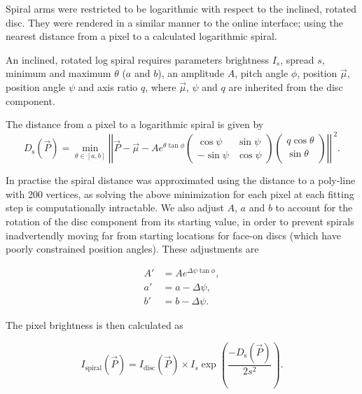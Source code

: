 \documentclass[../main.tex]{subfiles}
\begin{document}
Spiral arms were restricted to be logarithmic with respect to the inclined, rotated disc. They were rendered in a similar manner to the online interface; using the nearest distance from a pixel to a calculated logarithmic spiral.

An inclined, rotated log spiral requires parameters brightness $I_s$, spread $s$, minimum and maximum $\theta$ ($a$ and $b$), an amplitude $A$, pitch angle $\phi$, position $\vec\mu$, position angle $\psi$ and axis ratio $q$, where $\vec\mu$, $\psi$ and $q$ are inherited from the disc component.

The distance from a pixel to a logarithmic spiral is given by
\begin{equation}
  D_\mathrm{s}(\vec{P}) = \min_{\theta\in[a, b]}\left|\left|\vec{P} - \vec\mu - Ae^{\theta\tan\phi}\begin{pmatrix}
       \cos\psi & \sin\psi\\
       -\sin\psi & \cos\psi
       \end{pmatrix}
       \begin{pmatrix}
       q\cos\theta \\
       \sin\theta \\
       \end{pmatrix}
       \right|\right|^{\ 2}.
\end{equation}

In practise the spiral distance was approximated using the distance to a poly-line with 200 vertices, as solving the above minimization for each pixel at each fitting step is computationally intractable. We also adjust $A$, $a$ and $b$ to account for the rotation of the disc component from its starting value, in order to prevent spirals inadvertendly moving far from starting locations for face-on discs (which have poorly constrained position angles). These adjustments are

\begin{equation}
\begin{aligned}
  A' &= Ae^{\Delta\psi\tan\phi},\\
  a' &= a - \Delta\psi,\\
  b' &= b - \Delta\psi.
\end{aligned}
\end{equation}

The pixel brightness is then calculated as

\begin{equation}
I_\mathrm{spiral}(\vec{P}) = I_\mathrm{disc}(\vec{P}) \times I_s\exp\left(\frac{-D_\mathrm{s}(\vec{P})}{2s^2}\right).
\end{equation}
\end{document}
